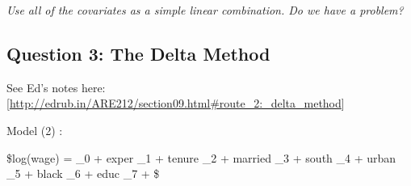 \documentclass[11pt,]{article}
\begin{document}
\emph{Use all of the covariates as a simple linear combination. Do we
have a problem?}

\subsection{Question 3: The Delta
Method}\label{question-3-the-delta-method}

See Ed's notes here:
{[}\url{http://edrub.in/ARE212/section09.html\#route_2:_delta_method}{]}

Model (2) :

\$log(wage) = \beta\_0 + exper \cdot \beta\_1 + tenure \cdot \beta\_2 +
married \cdot \beta\_3 + south \cdot \beta\_4 + urban \cdot \beta\_5 +
black \cdot \beta\_6 + educ \cdot \beta\_7 + \epsilon \$
\end{document}
